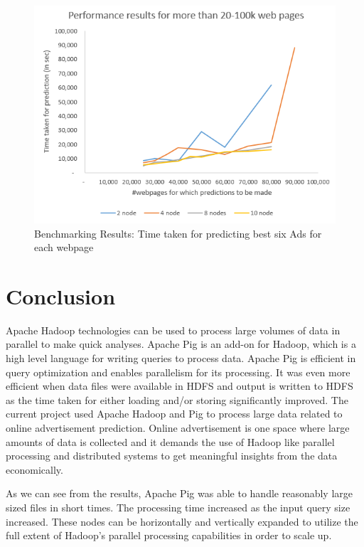 \documentclass[9pt,twocolumn,twoside]{../../styles/osajnl}
\begin{document}
\begin{figure}[hptb]
\centering
\includegraphics[width=\linewidth]{images/xlarge_100k.PNG}
\caption{ Benchmarking Results: Time taken for predicting best six Ads for each webpage}
\label{fig:xlarge_100k}
\end{figure}

\section{Conclusion}
Apache Hadoop technologies can be used to process large volumes of data in parallel to make quick analyses. Apache Pig is an add-on for Hadoop, which is a high level language for writing queries to process data. Apache Pig is efficient in query optimization and enables parallelism for its processing. It was even more efficient when data files were available in HDFS and output is written to HDFS as the time taken for either loading and/or storing significantly improved. The current project used Apache Hadoop and Pig to process large data related to online advertisement prediction. Online advertisement is one space where large amounts of data is collected and it demands the use of Hadoop like parallel processing and distributed systems to get meaningful insights from the data economically. 

As we can see from the results, Apache Pig was able to handle reasonably large sized files in short times. The processing time increased as the input query size increased. These nodes can be horizontally and vertically expanded to utilize the full extent of Hadoop's parallel processing capabilities in order to scale up.
\end{document}
